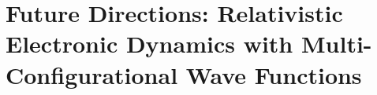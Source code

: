 \documentclass[12pt]{article}
\begin{document}




\linespread{1.0}
\section{Future Directions: Relativistic Electronic Dynamics with Multi-Configurational Wave Functions}
\linespread{1.5}
\label{sec:Future}


\end{document}
